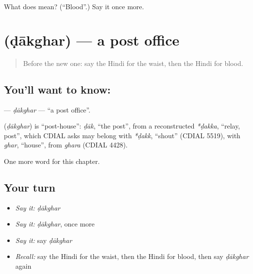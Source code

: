 \begin{tcolorbox}[breakable,colback=teal!4,colframe=teal!35!black,title={Before you move on}]
What does  mean? (\textquotedblleft{}Blood\textquotedblright{}.) Say it once more.
\end{tcolorbox}
\section[\texorpdfstring{\hi{डाकघर} (ḍākghar)}{डाकघर (ḍākghar)}]{ (ḍākghar) — a post office}

\label{lesson:HI-C152-dakghar}



\begin{quote}
Before the new one: say the Hindi for the waist, then the Hindi for blood.
\end{quote}

\subsection*{You'll want to know: }
\textbf{} — \emph{ḍākghar} — \textquotedblleft{}a post office\textquotedblright{}.

\begin{cousinweb}
\textbf{} (\emph{ḍākghar}) is \textquotedblleft{}post-house\textquotedblright{}: \emph{ḍāk}, \textquotedblleft{}the post\textquotedblright{}, from a reconstructed \emph{*ḍakka}, \textquotedblleft{}relay, post\textquotedblright{}, which CDIAL asks may belong with \emph{*ḍakk}, \textquotedblleft{}shout\textquotedblright{} (CDIAL 5519), with \emph{ghar}, \textquotedblleft{}house\textquotedblright{}, from \emph{ghara} (CDIAL 4428).
\end{cousinweb}

\begin{grammarlens}[title={What you've built}]
One more word for this chapter.
\end{grammarlens}

\subsection*{Your turn}
\begin{itemize}
\raggedright
  \item \emph{Say it:} \emph{ḍākghar}
  \item \emph{Say it:} \emph{ḍākghar}, once more
  \item \emph{Say it:} say \emph{ḍākghar}
  \item \emph{Recall:} say the Hindi for the waist, then the Hindi for blood, then say \emph{ḍākghar} again
\end{itemize}

